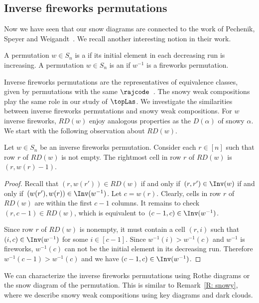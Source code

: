 \subsection{Inverse fireworks permutations}\label{subsec.inverse.fireworks}
Now we have seen that our snow diagrams 
are connected to the work of Pechenik, Speyer and Weigandt~\cite{PSW}.
We recall another interesting notion in their work.

\begin{defn}
A permutation $w \in S_n$ is a 
if its initial element in each decreasing run
is increasing. 
A permutation $w \in S_n$ is an 
if $w^{-1}$ is a fireworks permutation.
\end{defn}

Inverse fireworks permutations
are the representatives of equivalence classes,
given by permutations with the same $\rajcode$~\cite{PSW}.
The snowy weak compositions play the same role
in our study of $\topLas$.
We investigate the similarities between inverse fireworks permutations
and snowy weak compositions. 
For $w$ inverse fireworks, $RD(w)$ enjoy analogous properties as the $D(\alpha)$ of snowy $\alpha$. 
We start with the following 
observation about $RD(w)$.

\begin{lemma}\label{L: inv fire perm diagram}
Let $w \in S_n$ be an inverse fireworks permutation.
Consider each $r \in [n]$ such that 
row $r$ of $RD(w)$ is not empty. 
The rightmost cell in row $r$ of $RD(w)$
is $(r, w(r) - 1)$.
\end{lemma}
\begin{proof}
Recall that $(r, w(r')) \in RD(w)$ 
if and only if~$(r, r') \in \Inv(w)$
if and only if~$(w(r'), w(r)) 
\in \Inv(w^{-1})$.
Let $c = w(r)$.
Clearly, cells in row $r$
of $RD(w)$ are within the first $c - 1$
columns.
It remains to check $(r, c-1) \in RD(w)$,
which is equivalent to~$(c -1, c) \in \Inv(w^{-1})$.

Since row $r$ of $RD(w)$ is nonempty, 
it must contain a cell $(r,i)$ such that $(i,c)\in \Inv(w^{-1})$ 
for some $i \in [c-1]$. Since $w^{-1}(i)>w^{-1}(c)$ and $w^{-1}$ is 
fireworks, $w^{-1}(c)$ can not be the initial element in its 
decreasing run. Therefore $w^{-1}(c-1) > w^{-1}(c)$ and 
we have $(c-1, c) \in \Inv(w^{-1})$.
\end{proof}


We can characterize the inverse fireworks permutations
using Rothe diagrams or the snow diagram of the permutation. This 
is similar to Remark~\ref{R: snowy},
where we describe snowy weak compositions using key diagrams and 
dark clouds.

